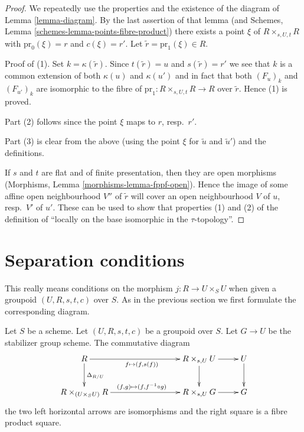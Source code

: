 \begin{proof}
We repeatedly use the properties and the existence of the diagram of
Lemma \ref{lemma-diagram}.
By the last assertion of that lemma (and
Schemes, Lemma \ref{schemes-lemma-points-fibre-product})
there exists a point $\xi$ of $R \times_{s, U, t} R$
with $\text{pr}_0(\xi) = r$ and $c(\xi) = r'$.
Let $\tilde r = \text{pr}_1(\xi) \in R$.

\medskip\noindent
Proof of (1). Set $k = \kappa(\tilde r)$. Since $t(\tilde r) = u$
and $s(\tilde r) = r'$ we see that $k$ is a common extension
of both $\kappa(u)$ and $\kappa(u')$ and in fact that
both $(F_u)_k$ and $(F_{u'})_k$ are isomorphic to the fibre of
$\text{pr}_1 : R \times_{s, U, t} R \to R$ over $\tilde r$.
Hence (1) is proved.

\medskip\noindent
Part (2) follows since the point $\xi$ maps to $r$, resp.\ $r'$.

\medskip\noindent
Part (3) is clear from the above (using the point $\xi$ for
$\tilde u$ and $\tilde u'$) and the definitions.

\medskip\noindent
If $s$ and $t$ are flat and of finite presentation, then
they are open morphisms (Morphisms, Lemma \ref{morphisms-lemma-fppf-open}).
Hence the image of some affine open neighbourhood $V''$ of $\tilde r$ will
cover an open neighbourhood $V$ of $u$, resp.\ $V'$ of $u'$.
These can be used to show that properties (1) and (2) of the
definition of ``locally on the base isomorphic in the
$\tau$-topology''.
\end{proof}









\section{Separation conditions}
\label{section-separation}

\noindent
This really means conditions on the morphism $j : R \to U \times_S U$
when given a groupoid $(U, R, s, t, c)$ over $S$. As in the previous
section we first formulate the corresponding diagram.

\begin{lemma}
\label{lemma-diagram-diagonal}
Let $S$ be a scheme.
Let $(U, R, s, t, c)$ be a groupoid over $S$.
Let $G \to U$ be the stabilizer group scheme.
The commutative diagram
$$
\xymatrix{
R \ar[d]^{\Delta_{R/U}} \ar[rrr]_{f \mapsto (f, s(f))} & & &
R \times_{s, U} U \ar[d] \ar[r] & U \ar[d] \\
R \times_{(U \times_S U)} R \ar[rrr]^{(f, g) \mapsto (f, f^{-1} \circ g)} & & &
R \times_{s, U} G \ar[r] & G
}
$$
the two left horizontal arrows are isomorphisms
and the right square is a fibre product square.
\end{lemma}


